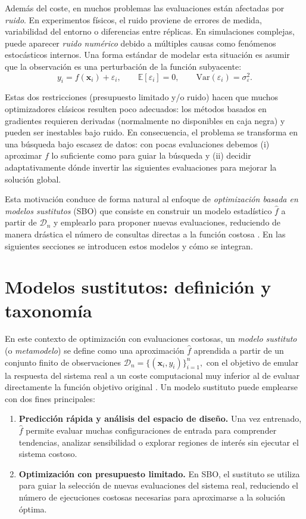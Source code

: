 Además del coste, en muchos problemas las evaluaciones están afectadas por \emph{ruido}. En experimentos físicos, el ruido proviene de errores de medida, variabilidad del entorno o diferencias entre réplicas. En simulaciones complejas, puede aparecer \emph{ruido numérico} debido a múltiples causas como fenómenos estocásticos internos. Una forma estándar de modelar esta situación es asumir que la observación es una perturbación de la función subyacente:
\[
y_i = f(\bm{x}_i) + \varepsilon_i, 
\qquad 
\mathbb{E}[\varepsilon_i]=0,
\qquad 
\mathrm{Var}(\varepsilon_i)=\sigma_\varepsilon^2.
\]

Estas dos restricciones (presupuesto limitado y/o ruido) hacen que muchos optimizadores clásicos resulten poco adecuados: los métodos basados en gradientes requieren derivadas (normalmente no disponibles en caja negra) y pueden ser inestables bajo ruido. En consecuencia, el problema se transforma en una búsqueda bajo escasez de datos: con pocas evaluaciones debemos (i) aproximar $f$ lo suficiente como para guiar la búsqueda y (ii) decidir adaptativamente dónde invertir las siguientes evaluaciones para mejorar la solución global.

Esta motivación conduce de forma natural al enfoque de \emph{optimización basada en modelos sustitutos} (SBO) que consiste en construir un modelo estadístico $\hat{f}$ a partir de $\mathcal{D}_n$ y emplearlo para proponer nuevas evaluaciones, reduciendo de manera drástica el número de consultas directas a la función costosa \cite{forrester2008engineering,jiang2020surrogate}. En las siguientes secciones se introducen estos modelos y cómo se integran.

\section{Modelos sustitutos: definición y taxonomía}
\label{sec:surrogates_def_tax}

En este contexto de optimización con evaluaciones costosas, un \emph{modelo sustituto}
(o \emph{metamodelo}) se define como una aproximación $\hat{f}$ aprendida a partir de un
conjunto finito de observaciones
$
\mathcal{D}_n=\{(\bm{x}_i,y_i)\}_{i=1}^n,$
con el objetivo de emular la respuesta del sistema real a un coste computacional muy
inferior al de evaluar directamente la función objetivo original \cite{forrester2008engineering,jiang2020surrogate}.
\newline
Un modelo sustituto puede emplearse con dos fines principales:
\begin{enumerate}
  \item \textbf{Predicción rápida y análisis del espacio de diseño.} Una vez entrenado,
  $\hat{f}$ permite evaluar muchas configuraciones de entrada para comprender tendencias,
  analizar sensibilidad o explorar regiones de interés sin ejecutar el sistema costoso.
  \item \textbf{Optimización con presupuesto limitado.} En SBO,
  el sustituto se utiliza para guiar la selección de nuevas evaluaciones del sistema real,
  reduciendo el número de ejecuciones costosas necesarias para aproximarse a la solución
  óptima. \cite{jiang2020surrogate}
\end{enumerate}


